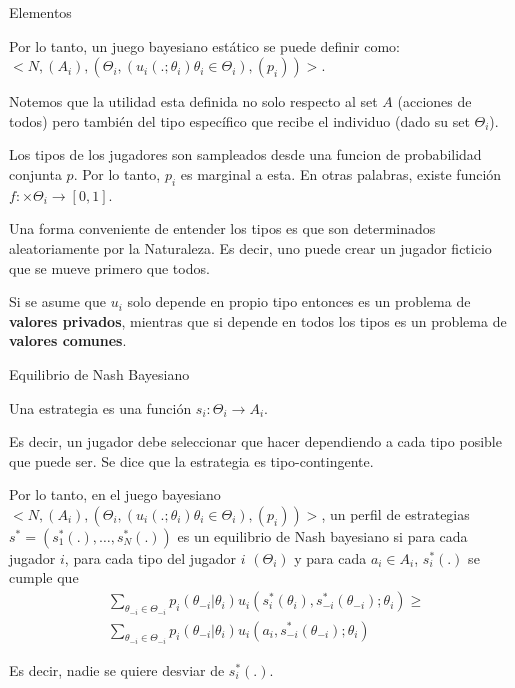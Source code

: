 \documentclass[notes, 11pt]{beamer} %
\newenvironment{wideitemize}{\itemize\addtolength{\itemsep}{10pt}}{\enditemize}
\begin{document}
\begin{frame}{Elementos}
	\begin{wideitemize}
		\item<1-> Por lo tanto, un juego bayesiano est\'atico se puede definir como: $<N, (A_{i}), (\Theta_{i}, (u_{i}(.;\theta_{i}) \theta_{i} \in \Theta_{i}),(p_{i}))>$.
		\item<2-> Notemos que la utilidad esta definida no solo respecto al set $A$ (acciones de todos) pero tambi\'en del tipo espec\'ifico que recibe el individuo (dado su set $\Theta_{i}$).
		\item<3-> Los tipos de los jugadores son sampleados desde una funcion de probabilidad conjunta $p$. Por lo tanto, $p_{i}$ es marginal a esta. En otras palabras, existe funci\'on $f: \times \Theta_{i} \rightarrow [0,1]$.
		\item<4-> Una forma conveniente de entender los tipos es que son determinados aleatoriamente por la Naturaleza. Es decir, uno puede crear un jugador ficticio que se mueve primero que todos.
		\item<5-> Si se asume que $u_{i}$ solo depende en propio tipo entonces es un problema de \textbf{valores privados}, mientras que si depende en todos los tipos es un problema de \textbf{valores comunes}.
	\end{wideitemize}
\end{frame}

\begin{frame}{Equilibrio de Nash Bayesiano}
	\begin{wideitemize}
		\item<1-> Una estrategia es una funci\'on $s_{i}: \Theta_{i} \rightarrow A_{i}$.
		\item<2-> Es decir, un jugador debe seleccionar que hacer dependiendo a cada tipo posible que puede ser. Se dice que la estrategia es tipo-contingente.
		\item<3-> Por lo tanto, en el juego bayesiano $<N, (A_{i}), (\Theta_{i}, (u_{i}(.;\theta_{i}) \theta_{i} \in \Theta_{i}),(p_{i}))>$, un perfil de estrategias $s^{*} = (s_{1}^{*}(.), \dots, s_{N}^{*}(.))$ es un equilibrio de Nash bayesiano si para cada jugador $i$, para cada tipo del jugador $i$ $(\Theta_{i})$ y para cada $a_{i} \in A_{i}$, $s_{i}^{*}(.)$ se cumple que 
		\begin{align*}
			&\sum_{\theta_{-i} \in \Theta_{-i}} p_{i}(\theta_{-i}|\theta_{i}) u_{i}(s_{i}^{*}(\theta_{i}), s_{-i}^{*}(\theta_{-i});\theta_{i}) \geq \\
			&\sum_{\theta_{-i} \in \Theta_{-i}} p_{i}(\theta_{-i}|\theta_{i}) u_{i}(a_{i}, s_{-i}^{*}(\theta_{-i});\theta_{i})
		\end{align*}
		\item<4-> Es decir, nadie se quiere desviar de $s_{i}^{*}(.)$.
	\end{wideitemize}
\end{frame}
\end{document}

